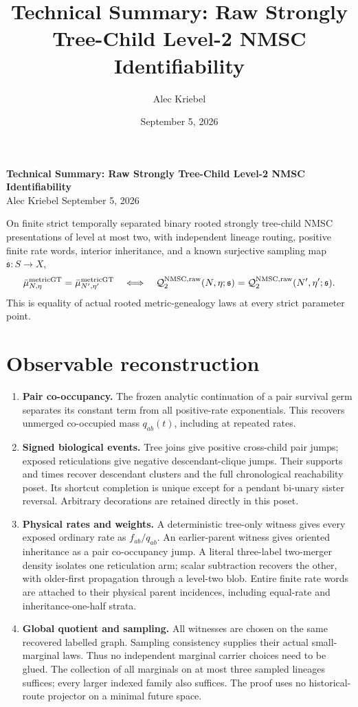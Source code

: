 \documentclass[10pt]{article}
\title{\bfseries Technical Summary: Raw Strongly Tree-Child Level-2 NMSC Identifiability}
\author{Alec Kriebel}\date{September 5, 2026}
\newcommand{\Qraw}{\mathcal Q^{\mathrm{NMSC,raw}}_2}
\begin{document}
\begin{center}
{\large\bfseries Technical Summary: Raw Strongly Tree-Child Level-2 NMSC Identifiability}\\[5pt]
Alec Kriebel \quad September 5, 2026
\end{center}
\noindent On finite strict temporally separated binary rooted strongly tree-child NMSC presentations of level at most two, with independent lineage routing, positive finite rate words, interior inheritance, and a known surjective sampling map $\mathfrak s:S\to X$,
\[
 \bar\mu^{\rm metricGT}_{N,\eta}=\bar\mu^{\rm metricGT}_{N',\eta'}
 \quad\Longleftrightarrow\quad
 \Qraw(N,\eta;\mathfrak s)=\Qraw(N',\eta';\mathfrak s).
\]
This is equality of actual rooted metric-genealogy laws at every strict parameter point.

\section*{Observable reconstruction}
\begin{enumerate}[leftmargin=1.5em]
\item \textbf{Pair co-occupancy.} The frozen analytic continuation of a pair survival germ separates its constant term from all positive-rate exponentials. This recovers unmerged co-occupied mass $q_{ab}(t)$, including at repeated rates.
\item \textbf{Signed biological events.} Tree joins give positive cross-child pair jumps; exposed reticulations give negative descendant-clique jumps. Their supports and times recover descendant clusters and the full chronological reachability poset. Its shortcut completion is unique except for a pendant bi-unary sister reversal. Arbitrary decorations are retained directly in this poset.
\item \textbf{Physical rates and weights.} A deterministic tree-only witness gives every exposed ordinary rate as $f_{ab}/q_{ab}$. An earlier-parent witness gives oriented inheritance as a pair co-occupancy jump. A literal three-label two-merger density isolates one reticulation arm; scalar subtraction recovers the other, with older-first propagation through a level-two blob. Entire finite rate words are attached to their physical parent incidences, including equal-rate and inheritance-one-half strata.
\item \textbf{Global quotient and sampling.} All witnesses are chosen on the same recovered labelled graph. Sampling consistency supplies their actual small-marginal laws. Thus no independent marginal carrier choices need to be glued. The collection of all marginals on at most three sampled lineages suffices; every larger indexed family also suffices. The proof uses no historical-route projector on a minimal future space.
\end{enumerate}
\end{document}
